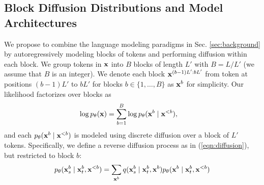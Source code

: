 \documentclass{article} %
\begin{document}

\subsection{Block Diffusion Distributions and Model Architectures}\label{sec:sar-elbo}
We propose to combine the language modeling paradigms in Sec. \ref{sec:background} by autoregressively modeling blocks of tokens and performing diffusion within each block. 
We group tokens in ${\mathbf x}$ into $B$ blocks of length $L'$ with $B=L/L'$ (we assume that $B$ is an integer). We denote each block ${\mathbf x}^{(b-1)L':bL'}$ from token at positions $(b-1)L'$ to $bL'$ for blocks $b \in \{ 1, \dots, B \}$ as ${\mathbf x}^b$ for simplicity. Our likelihood factorizes over blocks as
\begin{align}\label{eqn:sar-ll}
     \log p_\theta({\mathbf x}) &= \sum_{b = 1}^{B} \log p_\theta({\mathbf x}^{b} \mid {\mathbf x}^{<b}),
\end{align}
and each $p_\theta({\mathbf x}^b \mid {\mathbf x}^{<b})$ is modeled using discrete diffusion over a block of $L'$ tokens. 
Specifically, we define a reverse diffusion process as in (\ref{eqn:diffusion}), but restricted to block $b$:
\begin{align}
    p_\theta({\mathbf x}_s^b \mid {\mathbf x}_t^b, {\mathbf x}^{<b}) = \sum_{{\mathbf x}^b} q({\mathbf x}_s^b \mid {\mathbf x}_t^b, {\mathbf x}^b)p_\theta({\mathbf x}^b\mid {\mathbf x}^b_t,{\mathbf x}^{<b})
\end{align}
\end{document}
